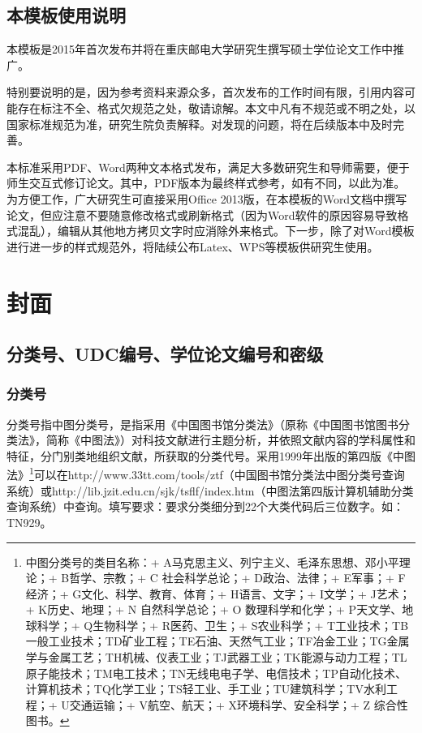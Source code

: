 \documentclass{cqupt_thesis}
\begin{document}
    \subsection{本模板使用说明}
    本模板是2015年首次发布并将在重庆邮电大学研究生撰写硕士学位论文工作中推广。

    特别要说明的是，因为参考资料来源众多，首次发布的工作时间有限，引用内容可能存在标注不全、格式欠规范之处，敬请谅解。本文中凡有不规范或不明之处，以国家标准规范为准，研究生院负责解释。对发现的问题，将在后续版本中及时完善。

    本标准采用PDF、Word两种文本格式发布，满足大多数研究生和导师需要，便于师生交互式修订论文。其中，PDF版本为最终样式参考，如有不同，以此为准。为方便工作，广大研究生可直接采用Office 2013版，在本模板的Word文档中撰写论文，但应注意不要随意修改格式或刷新格式（因为Word软件的原因容易导致格式混乱），编辑从其他地方拷贝文字时应消除外来格式。下一步，除了对Word模板进行进一步的样式规范外，将陆续公布Latex、WPS等模板供研究生使用。


    \section{封面}

    \subsection{分类号、UDC编号、学位论文编号和密级}

    \subsubsection{分类号}
    分类号指中图分类号，是指采用《中国图书馆分类法》（原称《中国图书馆图书分类法》，简称《中图法》）对科技文献进行主题分析，并依照文献内容的学科属性和特征，分门别类地组织文献，所获取的分类代号。采用1999年出版的第四版《中图法》\footnote{
        中图分类号的类目名称：+ A马克思主义、列宁主义、毛泽东思想、邓小平理论；+ B哲学、宗教；+ C 社会科学总论；+ D政治、法律；+ E军事；+ F经济；+ G文化、科学、教育、体育；+ H语言、文字；+ I文学；+ J艺术；+ K历史、地理；+ N 自然科学总论；+ O 数理科学和化学；+ P天文学、地球科学；+ Q生物科学；+ R医药、卫生；+ S农业科学；+ T工业技术；TB一般工业技术；TD矿业工程；TE石油、天然气工业；TF冶金工业；TG金属学与金属工艺；TH机械、仪表工业；TJ武器工业；TK能源与动力工程；TL原子能技术；TM电工技术；TN无线电电子学、电信技术；TP自动化技术、计算机技术；TQ化学工业；TS轻工业、手工业；TU建筑科学；TV水利工程；+ U交通运输；+ V航空、航天；+ X环境科学、安全科学；+ Z 综合性图书。}可以在http://www.33tt.com/tools/ztf（中国图书馆分类法中图分类号查询系统）或http://lib.jzit.edu.cn/sjk/tsflf/index.htm（中图法第四版计算机辅助分类查询系统）中查询。填写要求：要求分类细分到22个大类代码后三位数字。如：TN929。
\end{document}
